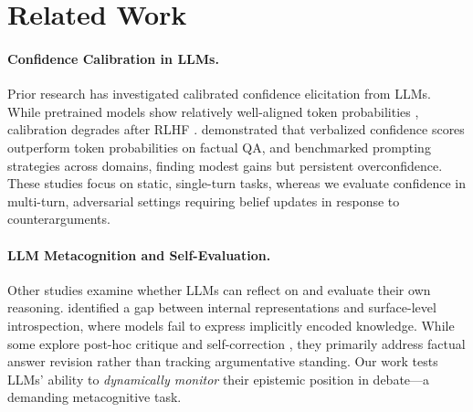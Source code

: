 \documentclass{article}
\begin{document}



\section{Related Work}

\paragraph{Confidence Calibration in LLMs.}
Prior research has investigated calibrated confidence elicitation from LLMs. While pretrained models show relatively well-aligned token probabilities \citep{kadavath2022know}, calibration degrades after RLHF \citep{west2025basemodelsbeataligned,openai2024gpt4technicalreport}. \citet{tian2023justask} demonstrated that verbalized confidence scores outperform token probabilities on factual QA, and \citet{xiong2024uncertainty} benchmarked prompting strategies across domains, finding modest gains but persistent overconfidence. These studies focus on static, single-turn tasks, whereas we evaluate confidence in multi-turn, adversarial settings requiring belief updates in response to counterarguments.

\paragraph{LLM Metacognition and Self-Evaluation.}
Other studies examine whether LLMs can reflect on and evaluate their own reasoning. \citet{song2025introspect} identified a gap between internal representations and surface-level introspection, where models fail to express implicitly encoded knowledge. While some explore post-hoc critique and self-correction \cite{Li2024ConfidenceMR}, they primarily address factual answer revision rather than tracking argumentative standing. Our work tests LLMs' ability to \textit{dynamically monitor} their epistemic position in debate—a demanding metacognitive task.
\end{document}
